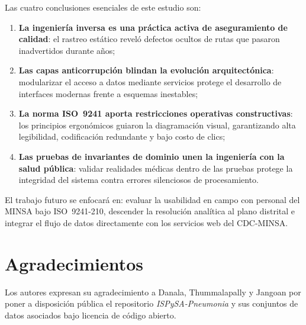 \documentclass[conference]{IEEEtran}
\begin{document}
Las cuatro conclusiones esenciales de este estudio son:
\begin{enumerate}
  \item \textbf{La ingenier\'ia inversa es una pr\'actica activa de aseguramiento de calidad}: el rastreo est\'atico revel\'o defectos ocultos de rutas que pasaron inadvertidos durante a\~nos;
  \item \textbf{Las capas anticorrupci\'on blindan la evoluci\'on arquitect\'onica}: modularizar el acceso a datos mediante servicios protege el desarrollo de interfaces modernas frente a esquemas inestables;
  \item \textbf{La norma ISO~9241 aporta restricciones operativas constructivas}: los principios ergon\'omicos guiaron la diagramaci\'on visual, garantizando alta legibilidad, codificaci\'on redundante y bajo costo de clics;
  \item \textbf{Las pruebas de invariantes de dominio unen la ingenier\'ia con la salud p\'ublica}: validar realidades m\'edicas dentro de las pruebas protege la integridad del sistema contra errores silenciosos de procesamiento.
\end{enumerate}

El trabajo futuro se enfocar\'a en: evaluar la usabilidad en campo con personal del MINSA bajo ISO~9241-210, descender la resoluci\'on anal\'itica al plano distrital e integrar el flujo de datos directamente con los servicios web del CDC-MINSA.

\section*{Agradecimientos}

Los autores expresan su agradecimiento a Danala, Thummalapally y Jangoan por poner a disposici\'on p\'ublica el repositorio \textit{ISPySA-Pneumonia} y sus conjuntos de datos asociados bajo licencia de c\'odigo abierto.

\balance
\end{document}
